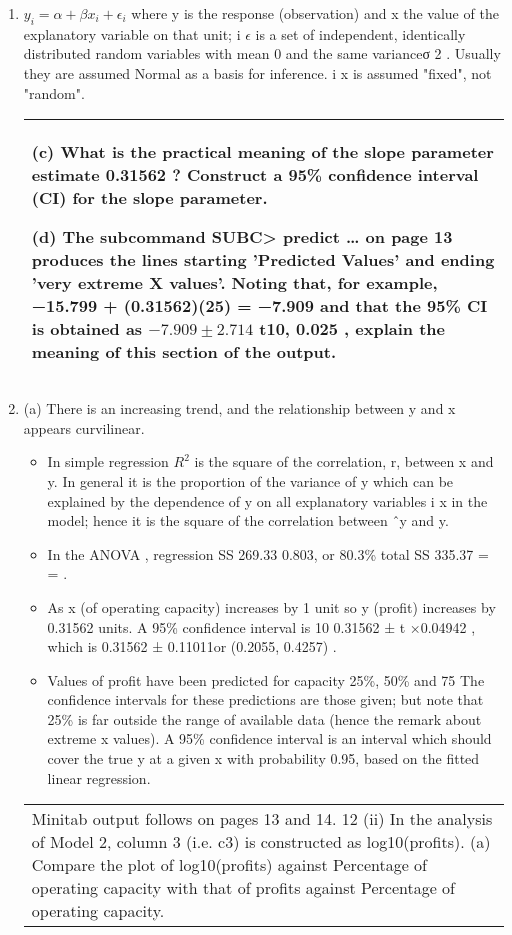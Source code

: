 \documentclass[a4paper,12pt]{article}
\begin{document}
\begin{enumerate}
\item  $y_i = \alpha + \beta x_i + \epsilon_i$
where y is the response (observation) and x the value of the explanatory variable on
that unit; { } i
$\epsilon$ is a set of independent, identically distributed random variables with
mean 0 and the same varianceσ 2 . Usually they are assumed Normal as a basis for
inference. i x is assumed "fixed", not "random".
\newpage
\begin{table}[ht!]
     \centering
     \begin{tabular}{|p{15cm}|}
     \hline        
\noindent
(c) What is the practical meaning of the slope parameter estimate
0.31562 ? Construct a 95\% confidence interval (CI) for the slope
parameter.

(d) The subcommand SUBC> predict … on page 13 produces the
lines starting 'Predicted Values' and ending 'very extreme X values'.
Noting that, for example, −15.799 + (0.31562)(25) = −7.909 and
that the 95\% CI is obtained as $−7.909 \pm 2.714$ t10, 0.025 , explain the
meaning of this section of the output.

\\ \hline
      \end{tabular}
    \end{table}

\item  (a) There is an increasing trend, and the relationship between y and x
appears curvilinear.
\begin{itemize}
\item In simple regression $R^2$ is the square of the correlation, r, between x
and y. In general it is the proportion of the variance of y which can be
explained by the dependence of y on all explanatory variables { } i x in the
model; hence it is the square of the correlation between ˆy and y.
\item In the ANOVA , regression SS 269.33 0.803, or 80.3\%
total SS 335.37
= = .
\item As x (\Percentage of operating capacity) increases by 1 unit so y (profit) increases
by 0.31562 units.
A 95\% confidence interval is 10 0.31562 ± t ×0.04942 , which is
0.31562 ± 0.11011or (0.2055, 0.4257) .
\item Values of profit have been predicted for capacity 25\%, 50\% and 75%
The confidence intervals for these predictions are those given; but note that
25\% is far outside the range of available data (hence the remark about extreme
x values). A 95\% confidence interval is an interval which should cover the
true y at a given x with probability 0.95, based on the fitted linear regression.
\end{itemize}
\begin{table}[ht!]
     \centering
     \begin{tabular}{|p{15cm}|}
     \hline        
\noindent 
Minitab output follows on pages 13 and 14.
12
(ii) In the analysis of Model 2, column 3 (i.e. c3) is constructed as
log10(profits).
(a) Compare the plot of log10(profits) against Percentage of operating capacity
with that of profits against Percentage of operating capacity.


\end{tabular}
\end{table}
\end{enumerate}
\end{document}
